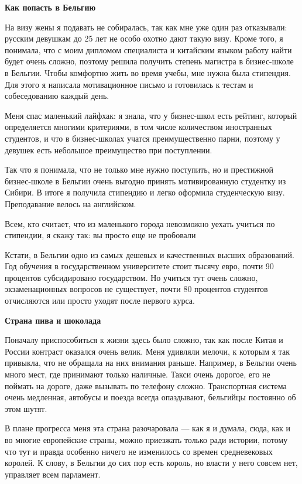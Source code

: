 \textbf{Как попасть в Бельгию}

На визу жены я подавать не собиралась, так как мне уже один раз отказывали: русским девушкам до 25 лет не особо охотно дают такую визу. Кроме того, я понимала, что с моим дипломом специалиста и китайским языком работу найти будет очень сложно, поэтому решила получить степень магистра в бизнес-школе в Бельгии. Чтобы комфортно жить во время учебы, мне нужна была стипендия. Для этого я написала мотивационное письмо и готовилась к тестам и собеседованию каждый день.

Меня спас маленький лайфхак: я знала, что у бизнес-школ есть рейтинг, который определяется многими критериями, в том числе количеством иностранных студентов, и что в бизнес-школах учатся преимущественно парни, поэтому у девушек есть небольшое преимущество при поступлении.

Так что я понимала, что не только мне нужно поступить, но и престижной бизнес-школе в Бельгии очень выгодно принять мотивированную студентку из Сибири. В итоге я получила стипендию и легко оформила студенческую визу. Преподавание велось на английском.

\begin{fancyquotes}
    Всем, кто считает, что из маленького города невозможно уехать учиться по стипендии, я скажу так: вы просто еще не пробовали
\end{fancyquotes}

Кстати, в Бельгии одно из самых дешевых и качественных высших образований. Год обучения в государственном университете стоит тысячу евро, почти 90 процентов субсидировано государством. Но учиться тут очень сложно, экзаменационных вопросов не существует, почти 80 процентов студентов отчисляются или просто уходят после первого курса.

\textbf{Страна пива и шоколада}

Поначалу приспособиться к жизни здесь было сложно, так как после Китая и России контраст оказался очень велик. Меня удивляли мелочи, к которым я так привыкла, что не обращала на них внимания раньше. Например, в Бельгии очень много мест, где принимают только наличные. Такси очень дорогое, его не поймать на дороге, даже вызывать по телефону сложно. Транспортная система очень медленная, автобусы и поезда всегда опаздывают, бельгийцы постоянно об этом шутят.

В плане прогресса меня эта страна разочаровала — как я и думала, сюда, как и во многие европейские страны, можно приезжать только ради истории, потому что тут и правда особенно ничего не изменилось со времен средневековых королей. К слову, в Бельгии до сих пор есть король, но власти у него совсем нет, управляет всем парламент.

